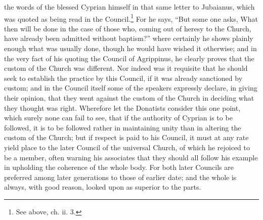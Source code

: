 the words of the blessed Cyprian himself in that same letter to Jubaianus, which was quoted as being read in the Council.\footnote{\par  See above, ch. ii. 3.} For he says, ``But some one asks, What then will be done in the case of those who, coming out of heresy to the Church, have already been admitted without baptism?'' where certainly he shows plainly enough what was usually done, though he would have wished it otherwise; and in the very fact of his quoting the Council of Agrippinus, he clearly proves that the custom of the Church was different. Nor indeed was it requisite that he should seek to establish the practice by this Council, if it was already sanctioned by custom; and in the Council itself some of the speakers expressly declare, in giving their opinion, that they went against the custom of the Church in deciding what they thought was right. Wherefore let the Donatists consider this one point, which surely none can fail to see, that if the authority of Cyprian is to be followed, it is to be followed rather in maintaining unity than in altering the custom of the Church; but if respect is paid to his Council, it must at any rate yield place to the later Council of the universal Church, of which he rejoiced to be a member, often warning his associates that they should all follow his example in upholding the coherence of the whole body. For both later Councils are preferred among later generations to those of earlier date; and the whole is always, with good reason, looked upon as superior to the parts.


